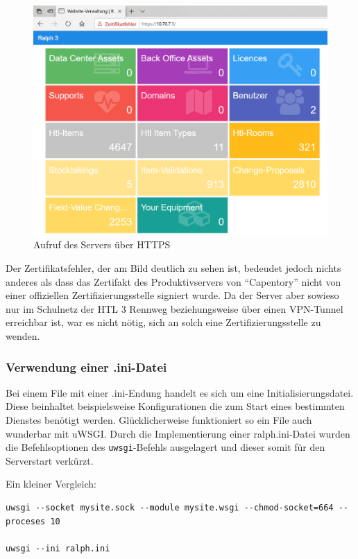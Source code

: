 \begin{figure}[ht]
\centering
\includegraphics{https.png}
\caption{Aufruf des Servers über HTTPS}
\end{figure}

Der Zertifikatsfehler, der am Bild deutlich zu sehen ist, bedeudet
jedoch nichts anderes als dass das Zertifakt des Produktivservers von
``Capentory'' nicht von einer offiziellen Zertifizierungsstelle signiert
wurde. Da der Server aber sowieso nur im Schulnetz der HTL 3 Rennweg
beziehungsweise über einen VPN-Tunnel erreichbar ist, war es nicht
nötig, sich an solch eine Zertifizierungsstelle zu wenden.

\hypertarget{verwendung-einer-.ini-datei}{%
\subsubsection{Verwendung einer
.ini-Datei}\label{verwendung-einer-.ini-datei}}

Bei einem File mit einer .ini-Endung handelt es sich um eine
Initialisierungsdatei. Diese beinhaltet beispielsweise Konfigurationen
die zum Start eines bestimmten Dienstes benötigt werden.
Glücklicherweise funktioniert so ein File auch wunderbar mit uWSGI.
Durch die Implementierung einer ralph.ini-Datei wurden die
Befehlsoptionen des \texttt{uwsgi}-Befehls ausgelagert und dieser somit
für den Serverstart verkürzt.

Ein kleiner Vergleich:

\begin{verbatim}
uwsgi --socket mysite.sock --module mysite.wsgi --chmod-socket=664 --proceses 10

uwsgi --ini ralph.ini
\end{verbatim}

